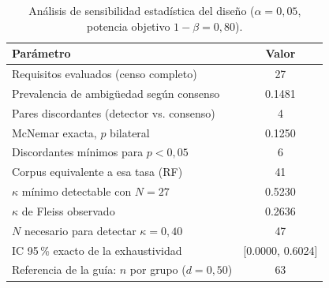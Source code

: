 \begin{table}[t]
\centering
\caption{Análisis de sensibilidad estadística del diseño
($\alpha = 0{,}05$, potencia objetivo $1-\beta = 0{,}80$).}
\label{tab:potencia}
\begin{tabular}{lc}
\hline
\textbf{Parámetro} & \textbf{Valor} \\
\hline
Requisitos evaluados (censo completo) & 27 \\
Prevalencia de ambigüedad según consenso & 0.1481 \\
Pares discordantes (detector vs. consenso) & 4 \\
McNemar exacta, $p$ bilateral & 0.1250 \\
Discordantes mínimos para $p < 0{,}05$ & 6 \\
Corpus equivalente a esa tasa (RF) & 41 \\
$\kappa$ mínimo detectable con $N = 27$ & 0.5230 \\
$\kappa$ de Fleiss observado & 0.2636 \\
$N$ necesario para detectar $\kappa = 0{,}40$ & 47 \\
IC 95\,\% exacto de la exhaustividad & [0.0000, 0.6024] \\
Referencia de la guía: $n$ por grupo ($d = 0{,}50$) & 63 \\
\hline
\end{tabular}
\end{table}
